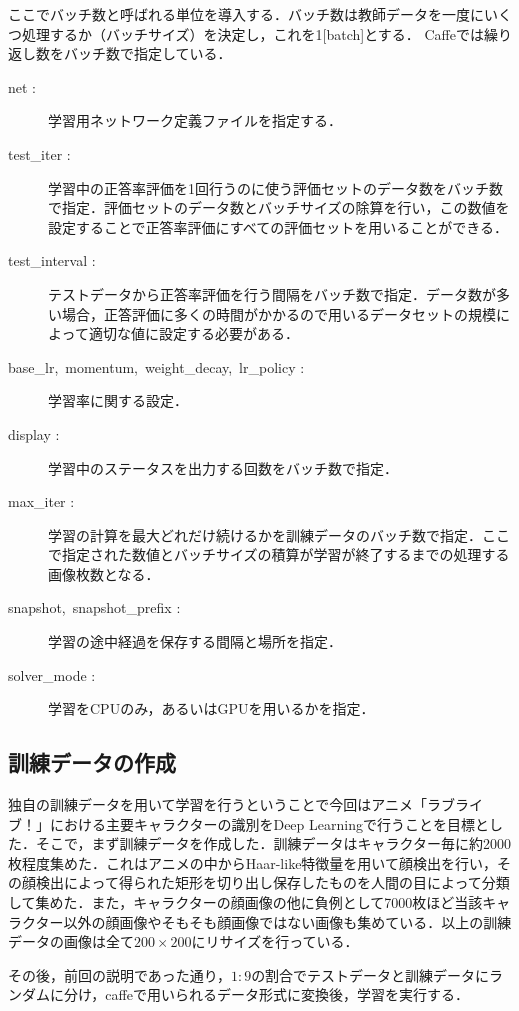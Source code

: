 \documentclass[a4paper,10pt]{jsarticle}
\begin{document}
ここでバッチ数と呼ばれる単位を導入する．バッチ数は教師データを一度にいくつ処理するか（バッチサイズ）を決定し，これを1[batch]とする．
Caffeでは繰り返し数をバッチ数で指定している．

\begin{description}
  \item[net :]学習用ネットワーク定義ファイルを指定する．
  \item[test\_iter :]学習中の正答率評価を1回行うのに使う評価セットのデータ数をバッチ数で指定．評価セットのデータ数とバッチサイズの除算を行い，この数値を設定することで正答率評価にすべての評価セットを用いることができる．
  \item[test\_interval :]テストデータから正答率評価を行う間隔をバッチ数で指定．データ数が多い場合，正答評価に多くの時間がかかるので用いるデータセットの規模によって適切な値に設定する必要がある．
  \item[base\_lr,\ momentum,\ weight\_decay,\ lr\_policy :]学習率に関する設定．
  \item[display :]学習中のステータスを出力する回数をバッチ数で指定．
  \item[max\_iter :]学習の計算を最大どれだけ続けるかを訓練データのバッチ数で指定．ここで指定された数値とバッチサイズの積算が学習が終了するまでの処理する画像枚数となる．
  \item[snapshot,\ snapshot\_prefix :]学習の途中経過を保存する間隔と場所を指定．
  \item[solver\_mode :]学習をCPUのみ，あるいはGPUを用いるかを指定．
\end{description}

\subsection{訓練データの作成}
独自の訓練データを用いて学習を行うということで今回はアニメ「ラブライブ！」における主要キャラクターの識別をDeep Learningで行うことを目標とした．そこで，まず訓練データを作成した．訓練データはキャラクター毎に約2000枚程度集めた．これはアニメの中からHaar-like特徴量を用いて顔検出を行い，その顔検出によって得られた矩形を切り出し保存したものを人間の目によって分類して集めた．また，キャラクターの顔画像の他に負例として7000枚ほど当該キャラクター以外の顔画像やそもそも顔画像ではない画像も集めている．以上の訓練データの画像は全て$200\times200$にリサイズを行っている．


その後，前回の説明であった通り，$1:9$の割合でテストデータと訓練データにランダムに分け，caffeで用いられるデータ形式に変換後，学習を実行する．
\end{document}
